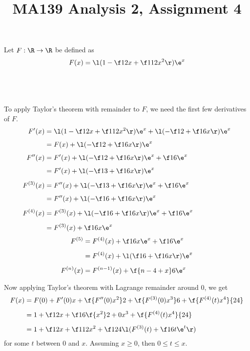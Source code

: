 \documentclass[a4paper]{article}
\title{MA139 Analysis 2, Assignment 4}
\begin{document}
\maketitle

\setlength{\parindent}{0em}
\setlength{\parskip}{1em}


Let $F : \R \to \R$ be defined as $$F(x) = \l( 1 - \f12 x + \f1{12} x^2 \r) \e^x$$

\subsection{~}

To apply Taylor's theorem with remainder to $F$, we need the first few derivatives of $F$. \begin{align*}
F'(x) &= \l( 1 - \f12 x + \f1{12} x^2 \r) \e^x + \l( - \f12 + \f16 x \r) \e^x\\[1ex]
&= F(x) + \l( - \f12 + \f16 x \r) \e^x\\[1ex]
F''(x) &= F'(x) + \l( - \f12 + \f16 x \r) \e^x + \f16 \e^x\\[1ex]
&= F'(x) + \l( - \f13 + \f16 x \r) \e^x\\[1ex]
F^{(3)}(x) &= F''(x) + \l( - \f13 + \f16 x \r) \e^x + \f16 \e^x\\[1ex]
&= F''(x) + \l( - \f16 + \f16 x \r) \e^x\\[1ex]
F^{(4)}(x) &= F^{(3)}(x) + \l( - \f16 + \f16 x \r) \e^x + \f16 \e^x\\[1ex]
&= F^{(3)}(x) + \f16 x \e^x
\end{align*}
\begin{align*}
F^{(5)} &= F^{(4)}(x) + \f16 x \e^x + \f16 \e^x\\[1ex]
&= F^{(4)}(x) + \l( \f16 + \f16 x \r) \e^x\\[1ex]
F^{(n)}(x) &= F^{(n-1)}(x) + \f{n - 4 + x}6 \e^x
\end{align*}

Now applying Taylor's theorem with Lagrange remainder around 0, we get \begin{align*}
F(x) &= F(0) + F'(0) x + \f{F''(0) x^2}2 + \f{F^{(3)}(0) x^3}6 + \f{F^{(4)}(t) x^4}{24}\\[1ex]
&= 1 + \f12 x + \f16 \f{x^2}2 + 0 x^3 + \f{F^{(4)}(t) x^4}{24}\\[1ex]
&= 1 + \f12 x + \f1{12} x^2 + \f1{24} \l( F^{(3)}(t) + \f16 t \e^t \r)
\end{align*}
for some $t$ between $0$ and $x$. Assuming $x \ge 0$, then $0 \le t \le x$.
\end{document}
